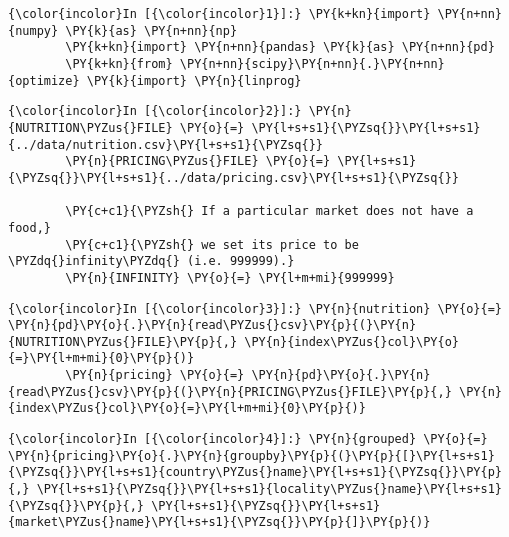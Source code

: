     

   

    \begin{Verbatim}[commandchars=\\\{\}]
{\color{incolor}In [{\color{incolor}1}]:} \PY{k+kn}{import} \PY{n+nn}{numpy} \PY{k}{as} \PY{n+nn}{np}
        \PY{k+kn}{import} \PY{n+nn}{pandas} \PY{k}{as} \PY{n+nn}{pd}
        \PY{k+kn}{from} \PY{n+nn}{scipy}\PY{n+nn}{.}\PY{n+nn}{optimize} \PY{k}{import} \PY{n}{linprog}
\end{Verbatim}


    \begin{Verbatim}[commandchars=\\\{\}]
{\color{incolor}In [{\color{incolor}2}]:} \PY{n}{NUTRITION\PYZus{}FILE} \PY{o}{=} \PY{l+s+s1}{\PYZsq{}}\PY{l+s+s1}{../data/nutrition.csv}\PY{l+s+s1}{\PYZsq{}}
        \PY{n}{PRICING\PYZus{}FILE} \PY{o}{=} \PY{l+s+s1}{\PYZsq{}}\PY{l+s+s1}{../data/pricing.csv}\PY{l+s+s1}{\PYZsq{}}
        
        \PY{c+c1}{\PYZsh{} If a particular market does not have a food,}
        \PY{c+c1}{\PYZsh{} we set its price to be \PYZdq{}infinity\PYZdq{} (i.e. 999999).}
        \PY{n}{INFINITY} \PY{o}{=} \PY{l+m+mi}{999999}
\end{Verbatim}


    \begin{Verbatim}[commandchars=\\\{\}]
{\color{incolor}In [{\color{incolor}3}]:} \PY{n}{nutrition} \PY{o}{=} \PY{n}{pd}\PY{o}{.}\PY{n}{read\PYZus{}csv}\PY{p}{(}\PY{n}{NUTRITION\PYZus{}FILE}\PY{p}{,} \PY{n}{index\PYZus{}col}\PY{o}{=}\PY{l+m+mi}{0}\PY{p}{)}
        \PY{n}{pricing} \PY{o}{=} \PY{n}{pd}\PY{o}{.}\PY{n}{read\PYZus{}csv}\PY{p}{(}\PY{n}{PRICING\PYZus{}FILE}\PY{p}{,} \PY{n}{index\PYZus{}col}\PY{o}{=}\PY{l+m+mi}{0}\PY{p}{)}
\end{Verbatim}


    \begin{Verbatim}[commandchars=\\\{\}]
{\color{incolor}In [{\color{incolor}4}]:} \PY{n}{grouped} \PY{o}{=} \PY{n}{pricing}\PY{o}{.}\PY{n}{groupby}\PY{p}{(}\PY{p}{[}\PY{l+s+s1}{\PYZsq{}}\PY{l+s+s1}{country\PYZus{}name}\PY{l+s+s1}{\PYZsq{}}\PY{p}{,} \PY{l+s+s1}{\PYZsq{}}\PY{l+s+s1}{locality\PYZus{}name}\PY{l+s+s1}{\PYZsq{}}\PY{p}{,} \PY{l+s+s1}{\PYZsq{}}\PY{l+s+s1}{market\PYZus{}name}\PY{l+s+s1}{\PYZsq{}}\PY{p}{]}\PY{p}{)}
\end{Verbatim}


